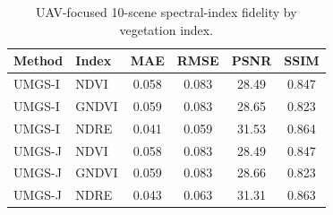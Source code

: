 \begin{table}[!t]
    \caption{UAV-focused 10-scene spectral-index fidelity by vegetation index.}
    \label{tab:index-detail}
    \centering
    \small
    \begin{tabular}{llcccc}
        \toprule
        Method & Index & MAE & RMSE & PSNR & SSIM \\
        \midrule
        UMGS-I & NDVI & 0.058 & 0.083 & 28.49 & 0.847 \\
        UMGS-I & GNDVI & 0.059 & 0.083 & 28.65 & 0.823 \\
        UMGS-I & NDRE & 0.041 & 0.059 & 31.53 & 0.864 \\
        \midrule
        UMGS-J & NDVI & 0.058 & 0.083 & 28.49 & 0.847 \\
        UMGS-J & GNDVI & 0.059 & 0.083 & 28.66 & 0.823 \\
        UMGS-J & NDRE & 0.043 & 0.063 & 31.31 & 0.863 \\
        \bottomrule
    \end{tabular}
\end{table}
